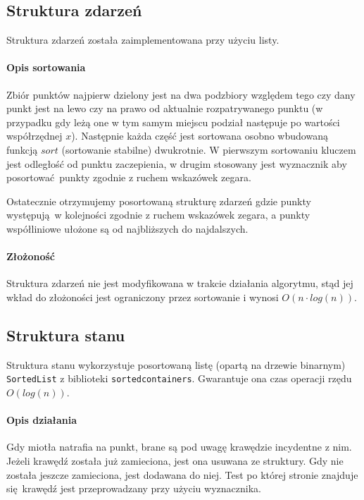 \documentclass[12pt]{article}
\begin{document}
		\subsection{Struktura zdarzeń}
			Struktura zdarzeń została zaimplementowana przy użyciu listy. 
			
			\paragraph{Opis sortowania}
				Zbiór punktów najpierw dzielony jest na dwa podzbiory względem tego czy dany punkt jest na lewo czy na prawo od aktualnie rozpatrywanego punktu (w przypadku gdy leżą one w tym samym miejscu podział następuje po wartości współrzędnej $ x $). Następnie każda część jest sortowana osobno wbudowaną funkcją $ sort $ (sortowanie stabilne) dwukrotnie. W pierwszym sortowaniu kluczem jest odległość od punktu zaczepienia, w drugim stosowany jest wyznacznik aby posortować punkty zgodnie z ruchem wskazówek zegara.
			
			\vspace{\baselineskip} %
			Ostatecznie otrzymujemy posortowaną strukturę zdarzeń gdzie punkty występują w kolejności zgodnie z ruchem wskazówek zegara, a punkty współliniowe ułożone są od najbliższych do najdalszych.
			
			\paragraph{Złożoność}
				Struktura zdarzeń nie jest modyfikowana w trakcie działania algorytmu, stąd jej wkład do złożoności jest ograniczony przez sortowanie i wynosi $ O(n \cdot log(n)) $.
		
		\subsection{Struktura stanu}
			Struktura stanu wykorzystuje posortowaną listę (opartą na drzewie binarnym) \lstinline|SortedList| z biblioteki \lstinline|sortedcontainers|. Gwarantuje ona czas operacji rzędu $ O(log(n)) $.
			
			\paragraph{Opis działania}
				Gdy miotła natrafia na punkt, brane są pod uwagę krawędzie incydentne z nim. Jeżeli krawędź została już zamieciona, jest ona usuwana ze struktury. Gdy nie została jeszcze zamieciona, jest dodawana do niej. Test po której stronie znajduje się krawędź jest przeprowadzany przy użyciu wyznacznika.
				
\end{document}
